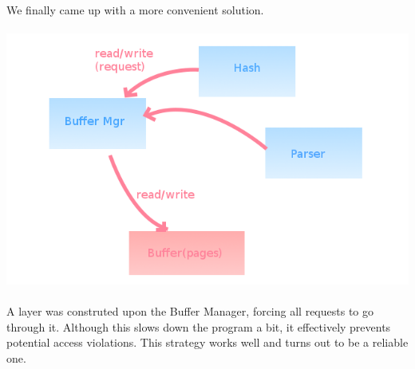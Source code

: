 \documentclass{article}
\begin{document}
        \paragraph{}
            We finally came up with a more convenient solution.
        \paragraph{} \includegraphics[scale=0.5]{img/arch2.png}
        \paragraph{}
            A layer was construted upon the Buffer Manager, forcing all requests to go through it. Although this slows down the program a bit, it effectively prevents potential access violations. This strategy works well and turns out to be a reliable one.
\end{document}
